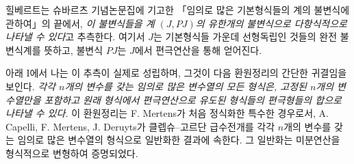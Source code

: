 
힐베르트는 슈바르츠 기념논문집에 기고한 「임의로 많은 기본형식들의 계의 불변식에 관하여」의 끝에서, \emph{이 불변식들을 계 $(J,PJ)$의 유한개의 불변식으로 다항식적으로 나타낼 수 있다}고 추측한다. 여기서 $J$는 기본형식들 가운데 선형독립인 것들의 완전 불변식계를 뜻하고, 불변식 $PJ$는 $J$에서 편극연산을 통해 얻어진다.

아래 I에서 나는 이 추측이 실제로 성립하며, 그것이 다음 환원정리의 간단한 귀결임을 보인다. \emph{각각 $n$개의 변수를 갖는 임의로 많은 변수열의 모든 형식은, 고정된 $n$개의 변수열만을 포함하고 원래 형식에서 편극연산으로 유도된 형식들의 편극형들의 합으로 나타낼 수 있다.} 이 환원정리는 F. Mertens가 처음 정식화한 특수한 경우로서, A. Capelli, F. Mertens, J. Deruyts가 클렙슈--고르단 급수전개를 각각 $n$개의 변수를 갖는 임의로 많은 변수열의 형식으로 일반화한 결과에 속한다. 그 일반화는 미분연산을 형식적으로 변형하여 증명되었다.
